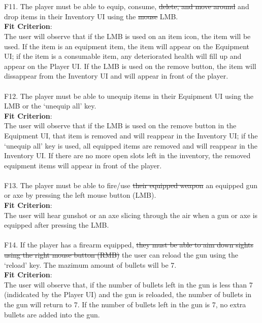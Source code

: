 \documentclass[12pt, titlepage]{article}
\begin{document}
\\\\
{\color{magenta} F11.} The player must be able to equip, consume, \sout{delete, and move around} {\color{magenta} and drop} items in their Inventory {\color{magenta} UI} using the \sout{mouse} {\color{magenta} LMB. \\
\textbf{Fit Criterion}:\\ The user will observe that if the LMB is used on an item icon, the item will be used. If the item is an equipment item, the item will appear on the Equipment UI; if the item is a consumable item, any deteriorated health will fill up and appear on the Player UI. If the LMB is used on the remove button, the item will dissappear from the Inventory UI and will appear in front of the player.}
\\\\
{\color{magenta} F12. The player must be able to unequip items in their Equipment UI using the LMB or the `unequip all’  key. \\
\textbf{Fit Criterion}:\\ The user will observe that if the LMB is used on the remove button in the Equipment UI, that item is removed and will reappear in the Inventory UI; if the ‘unequip all’  key is used, all equipped items are removed and will reappear in the Inventory UI. If there are no more open slots left in the inventory, the removed equipment items will appear in front of the player.}
\\\\
{\color{magenta} F13.} The player must be able to fire/use \sout{their equipped weapon} {\color{magenta} an equipped gun or axe} by pressing the left mouse button (LMB). \\
{\color{magenta} \textbf{Fit Criterion}:\\ The user will hear gunshot or an axe slicing through the air when a gun or axe is equipped after pressing the LMB. }
\\\\
{\color{magenta} F14.} If the player has a firearm equipped, \sout{they must be able to aim down sights using the right mouse button (RMB)} {\color{magenta} the user can reload the gun using the ‘reload’ key. The mazimum amount of bullets will be 7. \\
\textbf{Fit Criterion}:\\ The user will observe that, if the number of bullets left in the gun is less than 7 (indidcated by the Player UI) and the gun is reloaded, the number of bullets in the gun will return to 7. If the number of bullets left in the gun is 7, no extra bullets are added into the gun.}
\end{document}
